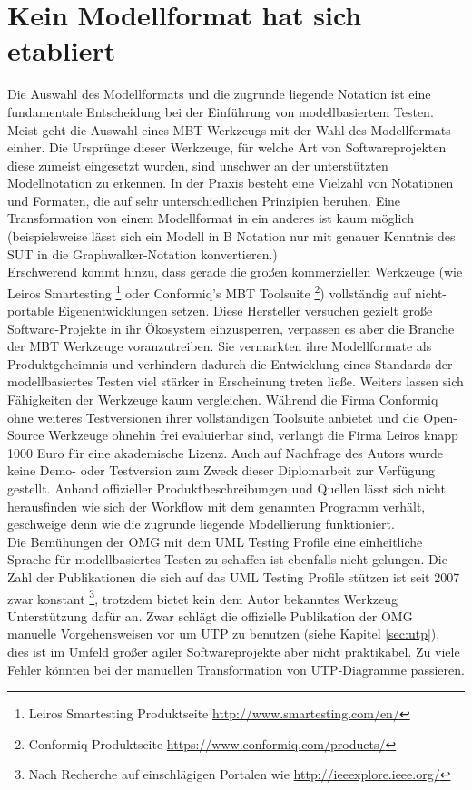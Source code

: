 \section{Kein Modellformat hat sich etabliert}
\label{sec:discussion_format}
Die Auswahl des Modellformats und die zugrunde liegende Notation ist eine fundamentale Entscheidung bei der Einführung von modellbasiertem Testen. Meist geht die Auswahl eines \Gls{MBT} Werkzeugs mit der Wahl des Modellformats einher. Die Ursprünge dieser Werkzeuge, für welche Art von Softwareprojekten diese zumeist eingesetzt wurden, sind unschwer an der unterstützten Modellnotation zu erkennen.  In der Praxis besteht eine Vielzahl von Notationen und Formaten, die auf sehr unterschiedlichen Prinzipien beruhen. Eine Transformation von einem Modellformat in ein anderes ist kaum möglich (beispielsweise lässt sich ein Modell in B Notation nur mit genauer Kenntnis des \Gls{SUT} in die Graphwalker-Notation konvertieren.)\\
Erschwerend kommt hinzu, dass gerade die großen kommerziellen Werkzeuge (wie Leiros Smartesting \footnote{Leiros Smartesting Produktseite \url{http://www.smartesting.com/en/}} oder Conformiq's \Gls{MBT} Toolsuite \footnote{Conformiq Produktseite \url{https://www.conformiq.com/products/}}) vollständig auf nicht-portable Eigenentwicklungen setzen. Diese Hersteller versuchen gezielt große Software-Projekte in ihr Ökosystem einzusperren, verpassen es aber die Branche der \Gls{MBT} Werkzeuge voranzutreiben. Sie vermarkten ihre Modellformate als Produktgeheimnis und verhindern dadurch die Entwicklung eines Standards der modellbasiertes Testen viel stärker in Erscheinung treten ließe. Weiters lassen sich Fähigkeiten der Werkzeuge kaum vergleichen. Während die Firma Conformiq ohne weiteres Testversionen ihrer vollständigen Toolsuite anbietet und die Open-Source Werkzeuge ohnehin frei evaluierbar sind, verlangt die Firma Leiros knapp 1000 Euro für eine akademische Lizenz. Auch auf Nachfrage des Autors wurde keine Demo- oder Testversion zum Zweck dieser Diplomarbeit zur Verfügung gestellt. Anhand offizieller Produktbeschreibungen und Quellen lässt sich nicht herausfinden wie sich der Workflow mit dem genannten Programm verhält, geschweige denn wie die zugrunde liegende Modellierung funktioniert.\\
Die Bemühungen der \Gls{OMG} mit dem UML Testing Profile eine einheitliche Sprache für modellbasiertes Testen zu schaffen ist ebenfalls nicht gelungen. Die Zahl der Publikationen die sich auf das UML Testing Profile stützen ist seit 2007 zwar konstant \footnote{Nach Recherche auf einschlägigen Portalen wie \url{http://ieeexplore.ieee.org/}}, trotzdem bietet kein dem Autor bekanntes Werkzeug Unterstützung dafür an. Zwar schlägt die offizielle Publikation der OMG \cite{_model-driven_2007} manuelle Vorgehensweisen vor um UTP zu benutzen (siehe Kapitel \ref{sec:utp}), dies ist im Umfeld großer agiler Softwareprojekte aber nicht praktikabel. Zu viele Fehler könnten bei der manuellen Transformation von UTP-Diagramme passieren.\\
